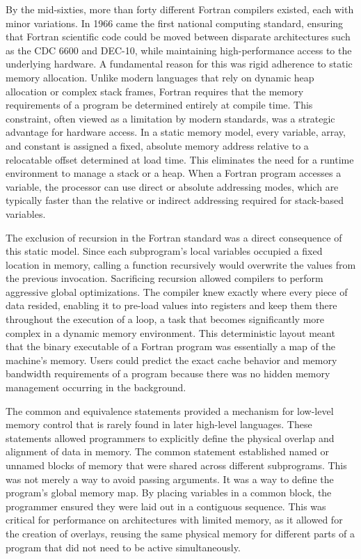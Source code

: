 By the mid-sixties, more than forty different Fortran compilers existed, each with minor variations. In 1966 came the first national computing standard, ensuring that Fortran scientific code could be moved between disparate architectures such as the CDC 6600 and DEC-10, while maintaining high-performance access to the underlying hardware. A fundamental reason for this was rigid adherence to static memory allocation. Unlike modern languages that rely on dynamic heap allocation or complex stack frames, Fortran requires that the memory requirements of a program be determined entirely at compile time. This constraint, often viewed as a limitation by modern standards, was a strategic advantage for hardware access. In a static memory model, every variable, array, and constant is assigned a fixed, absolute memory address relative to a relocatable offset determined at load time. This eliminates the need for a runtime environment to manage a stack or a heap. When a Fortran program accesses a variable, the processor can use direct or absolute addressing modes, which are typically faster than the relative or indirect addressing required for stack-based variables.

The exclusion of recursion in the Fortran standard was a direct consequence of this static model. Since each subprogram's local variables occupied a fixed location in memory, calling a function recursively would overwrite the values from the previous invocation. Sacrificing recursion allowed compilers to perform aggressive global optimizations. The compiler knew exactly where every piece of data resided, enabling it to pre-load values into registers and keep them there throughout the execution of a loop, a task that becomes significantly more complex in a dynamic memory environment. This deterministic layout meant that the binary executable of a Fortran program was essentially a map of the machine's memory. Users could predict the exact cache behavior and memory bandwidth requirements of a program because there was no hidden memory management occurring in the background.

The common and equivalence statements provided a mechanism for low-level memory control that is rarely found in later high-level languages. These statements allowed programmers to explicitly define the physical overlap and alignment of data in memory. The common statement established named or unnamed blocks of memory that were shared across different subprograms. This was not merely a way to avoid passing arguments. It was a way to define the program's global memory map. By placing variables in a common block, the programmer ensured they were laid out in a contiguous sequence. This was critical for performance on architectures with limited memory, as it allowed for the creation of overlays, reusing the same physical memory for different parts of a program that did not need to be active simultaneously. 

